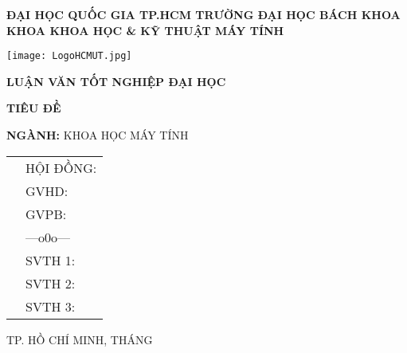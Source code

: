 \begin{titlepage}
\begin{center}
\Large{\begin{spacing}{1}
\textbf{ĐẠI HỌC QUỐC GIA TP.HCM \linebreak 
TRƯỜNG ĐẠI HỌC BÁCH KHOA \linebreak 
KHOA KHOA HỌC \& KỸ THUẬT MÁY TÍNH \linebreak}
\end{spacing}

\texttt{[image: LogoHCMUT.jpg]} 

\textbf{LUẬN VĂN TỐT NGHIỆP ĐẠI HỌC}} \vspace{3cm}

\LARGE{
\begin{spacing}{1}
\textbf{TIÊU ĐỀ}
\end{spacing}
}\vspace{0.75cm}
 
\large{ \textbf{NGÀNH:} KHOA HỌC MÁY TÍNH}
\end{center}
\vspace{2cm}
{\renewcommand{\arraystretch}{1}
\begin{table}[h]
    \bf
    \large
    \begin{tabular}{rl}
\hspace{5cm} & HỘI ĐỒNG: \\
& GVHD:   \\
& GVPB:  \\
& \hfill ---o0o---\\
& SVTH 1:  \\
& SVTH 2:  \\
& SVTH 3: 
    \end{tabular}
    
\end{table}}

\vfill
\begin{center}
    
\large{TP. HỒ CHÍ MINH, THÁNG }
\end{center}
\end{titlepage}